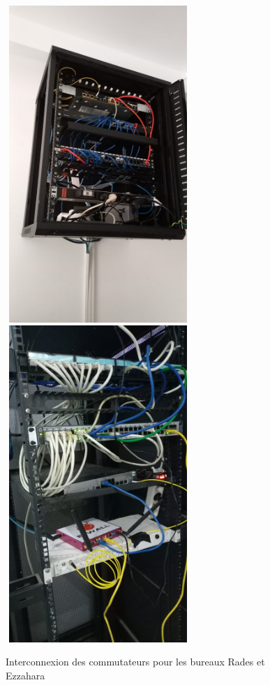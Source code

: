 \begin{figure}[H]
\centering
\includegraphics[width=7cm,height=12cm]{Images/BRades-ArmoirePrincipal.jpg} \includegraphics[width=7cm,height=12cm]{Images/Armoire-Ezzahara.jpg} 

\caption{Interconnexion des commutateurs pour les bureaux Rades et Ezzahara}
\label{Chap2.2.11}
\end{figure}


